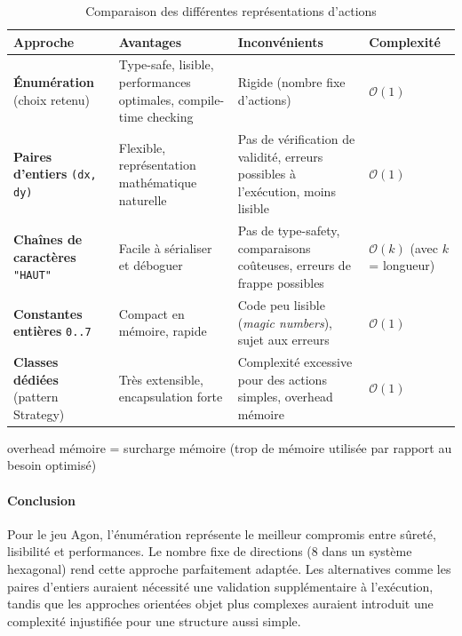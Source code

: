\documentclass[10pt]{article} %
\begin{document}
\begin{table}[h]
\centering
\begin{tabular}{|p{4cm}|p{3.4cm}|p{4cm}|p{2.3cm}|}
\hline
\textbf{Approche} & \textbf{Avantages} & \textbf{Inconvénients} & \textbf{Complexité} \\
\hline
\textbf{Énumération} (choix retenu) & 
Type-safe, lisible, performances optimales, compile-time checking & 
Rigide (nombre fixe d'actions) & 
$\mathcal{O}(1)$ \\
\hline
\textbf{Paires d'entiers} \texttt{(dx, dy)} & 
Flexible, représentation mathématique naturelle & 
Pas de vérification de validité, erreurs possibles à l'exécution, moins lisible & 
$\mathcal{O}(1)$ \\
\hline
\textbf{Chaînes de caractères} \texttt{"HAUT"} & 
Facile à sérialiser et déboguer & 
Pas de type-safety, comparaisons coûteuses, erreurs de frappe possibles & 
$\mathcal{O}(k)$ (avec $k$ = longueur) \\
\hline
\textbf{Constantes entières} \texttt{0..7} & 
Compact en mémoire, rapide & 
Code peu lisible (\textit{magic numbers}), sujet aux erreurs & 
$\mathcal{O}(1)$ \\
\hline
\textbf{Classes dédiées} (pattern Strategy) & 
Très extensible, encapsulation forte & 
Complexité excessive pour des actions simples, overhead mémoire & 
$\mathcal{O}(1)$ \\
\hline
\end{tabular}
\caption{Comparaison des différentes représentations d'actions}
\label{tab:action_comparison}

\end{table}
overhead mémoire = surcharge mémoire (trop de mémoire utilisée par rapport au besoin optimisé)

\paragraph{Conclusion}

Pour le jeu Agon, l'énumération représente le meilleur compromis entre sûreté, lisibilité et performances. Le nombre fixe de directions (8 dans un système hexagonal) rend cette approche parfaitement adaptée. Les alternatives comme les paires d'entiers auraient nécessité une validation supplémentaire à l'exécution, tandis que les approches orientées objet plus complexes auraient introduit une complexité injustifiée pour une structure aussi simple.

\end{document}
